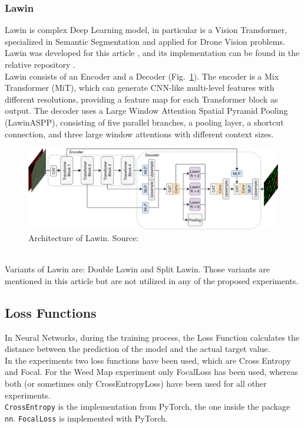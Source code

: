 \subsubsection{Lawin}

Lawin is complex Deep Learning model, in particular is a Vision Transformer, specialized in Semantic Segmentation and applied for Drone Vision problems.
Lawin was developed for this article \cite{WeedMap-PaperThesis}, and its implementation can be found in the relative repository \cite{WeedMap-Repository}.
% 
\\[0.3cm]Lawin consists of an Encoder and a Decoder (Fig.~\ref{fig:figure-3.4.2}).
The encoder is a Mix Transformer (MiT), which can generate CNN-like multi-level features with different resolutions, providing a feature map for each Transformer block as output.
The decoder uses a Large Window Attention Spatial Pyramid Pooling (LawinASPP), consisting of five parallel branches, a pooling layer, a shortcut connection, and three large window attentions with different context sizes.
\begin{figure}[t]
	\centering
	\includegraphics[width=15cm]{figures/figure-3.4.2.png}
	\caption[Architecture of Lawin]{Architecture of Lawin. Source: \cite{WeedMap-PaperThesis}}
	\label{fig:figure-3.4.2}
\end{figure}
% 
\\[0.3cm]Variants of Lawin are: Double Lawin and Split Lawin.
Those variants are mentioned in this article \cite{WeedMap-PaperThesis} but are not utilized in any of the proposed experiments.

\subsection{Loss Functions}

In Neural Networks, during the training process, the Loss Function calculates the distance between the prediction of the model and the actual target value.
\\[0.3cm]In the experiments two loss functions have been used, which are Cross Entropy and Focal.
For the Weed Map experiment only FocalLoss has been used, whereas both (or sometimes only CrossEntropyLoss) have been used for all other experiments.
\\[0.3cm]\texttt{CrossEntropy} is the implementation from PyTorch, the one inside the package \texttt{nn}. \texttt{FocalLoss} is implemented with PyTorch.

